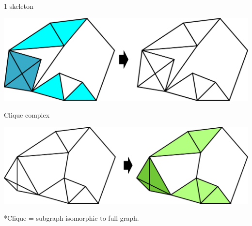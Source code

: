 \documentclass[10pt]{beamer}
\begin{document}
\begin{frame}{1-skeleton}

\begin{center}
\includegraphics[scale=0.3]{pictures/skeleton.pdf}
\end{center}

\end{frame}

\begin{frame}{Clique complex}

\begin{center}
\includegraphics[scale=0.3]{pictures/clique.pdf}
\end{center}

*Clique = subgraph isomorphic to full graph.

\end{frame}
\end{document}
